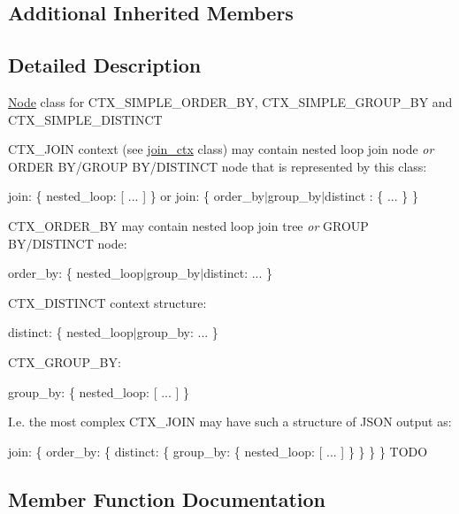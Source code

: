 \subsection*{Additional Inherited Members}


\subsection{Detailed Description}
\mbox{\hyperlink{classNode}{Node}} class for C\+T\+X\+\_\+\+S\+I\+M\+P\+L\+E\+\_\+\+O\+R\+D\+E\+R\+\_\+\+BY, C\+T\+X\+\_\+\+S\+I\+M\+P\+L\+E\+\_\+\+G\+R\+O\+U\+P\+\_\+\+BY and C\+T\+X\+\_\+\+S\+I\+M\+P\+L\+E\+\_\+\+D\+I\+S\+T\+I\+N\+CT

C\+T\+X\+\_\+\+J\+O\+IN context (see \mbox{\hyperlink{classopt__explain__json__namespace_1_1join__ctx}{join\+\_\+ctx}} class) may contain nested loop join node {\itshape or} O\+R\+D\+ER B\+Y/\+G\+R\+O\+UP B\+Y/\+D\+I\+S\+T\+I\+N\+CT node that is represented by this class\+:

join\+: \{ nested\+\_\+loop\+: \mbox{[} ... \mbox{]} \} or join\+: \{ order\+\_\+by$\vert$group\+\_\+by$\vert$distinct \+: \{ ... \} \}

C\+T\+X\+\_\+\+O\+R\+D\+E\+R\+\_\+\+BY may contain nested loop join tree {\itshape or} G\+R\+O\+UP B\+Y/\+D\+I\+S\+T\+I\+N\+CT node\+:

order\+\_\+by\+: \{ nested\+\_\+loop$\vert$group\+\_\+by$\vert$distinct\+: ... \}

C\+T\+X\+\_\+\+D\+I\+S\+T\+I\+N\+CT context structure\+:

distinct\+: \{ nested\+\_\+loop$\vert$group\+\_\+by\+: ... \}

C\+T\+X\+\_\+\+G\+R\+O\+U\+P\+\_\+\+BY\+:

group\+\_\+by\+: \{ nested\+\_\+loop\+: \mbox{[} ... \mbox{]} \}

I.\+e. the most complex C\+T\+X\+\_\+\+J\+O\+IN may have such a structure of J\+S\+ON output as\+:

join\+: \{ order\+\_\+by\+: \{ distinct\+: \{ group\+\_\+by\+: \{ nested\+\_\+loop\+: \mbox{[} ... \mbox{]} \} \} \} \} T\+O\+DO 

\subsection{Member Function Documentation}
\mbox{\label{classopt__explain__json__namespace_1_1sort__ctx_a49cc7069f8d31545de8a62dfa53cae41}} 
